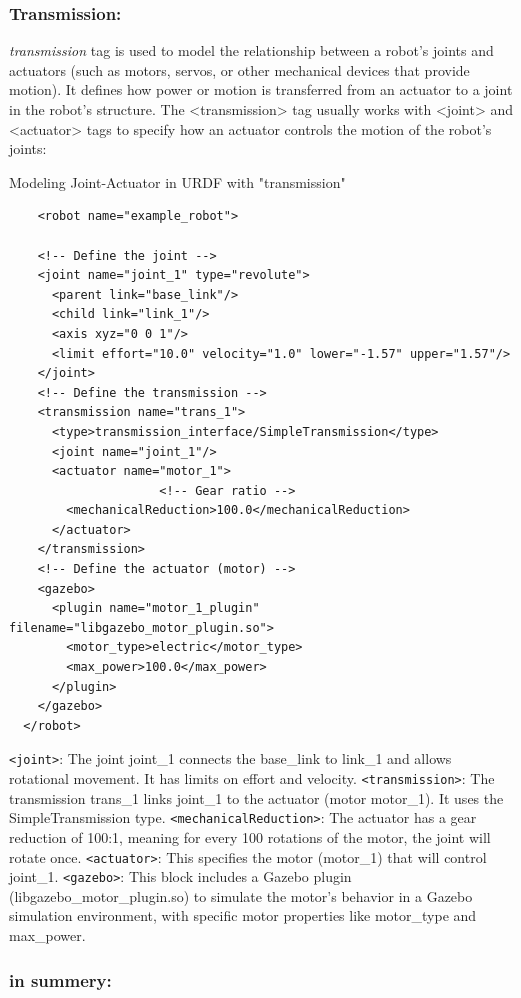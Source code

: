 \documentclass[../../main]{subfiles}
\begin{document}
\subsubsection{Transmission:}
\emph{transmission} tag is used to model the relationship between a robot's joints and actuators 
(such as motors, servos, or other mechanical devices that provide motion). 
It defines how power or motion is transferred from an actuator to a joint in the robot's structure.
The <transmission> tag usually works with <joint> and <actuator> tags to specify how an actuator controls the motion of the robot's joints:
\begin{codebox}[]{Modeling Joint-Actuator in URDF with "transmission"}
  \begin{verbatim}
    <robot name="example_robot">

    <!-- Define the joint -->
    <joint name="joint_1" type="revolute">
      <parent link="base_link"/>
      <child link="link_1"/>
      <axis xyz="0 0 1"/>
      <limit effort="10.0" velocity="1.0" lower="-1.57" upper="1.57"/>
    </joint>
    <!-- Define the transmission -->
    <transmission name="trans_1">
      <type>transmission_interface/SimpleTransmission</type>
      <joint name="joint_1"/>
      <actuator name="motor_1">
                     <!-- Gear ratio -->
        <mechanicalReduction>100.0</mechanicalReduction>
      </actuator>
    </transmission>
    <!-- Define the actuator (motor) -->
    <gazebo>
      <plugin name="motor_1_plugin" filename="libgazebo_motor_plugin.so">
        <motor_type>electric</motor_type>
        <max_power>100.0</max_power>
      </plugin>
    </gazebo>
  </robot>
\end{verbatim}
  \end{codebox}
\lstinline!<joint>!: The joint joint\_1 connects the base\_link to link\_1 and allows rotational movement. 
It has limits on effort and velocity.
\lstinline!<transmission>!: The transmission trans\_1 links joint\_1 to the actuator (motor motor\_1). It uses the SimpleTransmission type.
\lstinline!<mechanicalReduction>!: The actuator has a gear reduction of 100:1, meaning for every 100 rotations of the motor, the joint will rotate once.
\lstinline!<actuator>!: This specifies the motor (motor\_1) that will control joint\_1.
\lstinline!<gazebo>!: This block includes a Gazebo plugin (libgazebo\_motor\_plugin.so) to simulate the motor’s behavior in a Gazebo simulation environment, with specific motor properties like motor\_type and max\_power.

\subsubsection*{in summery:}
\end{document}
